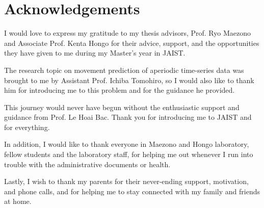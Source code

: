 \chapter*{Acknowledgements}

I would love to express my gratitude to my thesis advisors, Prof. Ryo Maezono and Associate Prof. Kenta Hongo for their advice, support, and the opportunities they have given to me during my Master's year in JAIST.

The research topic on movement prediction of aperiodic time-series data was brought to me by Assistant Prof. Ichiba Tomohiro, so I would also like to thank him for introducing me to this problem and for the guidance he provided.

This journey would never have begun without the enthusiastic support and guidance from Prof. Le Hoai Bac. Thank you for introducing me to JAIST and for everything.

In addition, I would like to thank everyone in Maezono and Hongo laboratory, fellow students and the laboratory staff, for helping me out whenever I run into trouble with the administrative documents or health.

Lastly, I wish to thank my parents for their never-ending support, motivation, and phone calls, and for helping me to stay connected with my family and friends at home.
